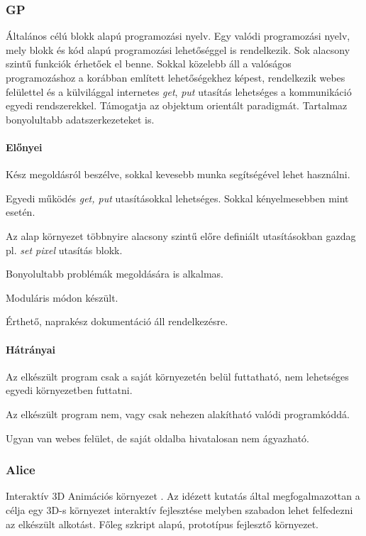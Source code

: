 \documentclass[12pt,a4paper,oneside]{report} %
\begin{document}
\subsubsection{GP} Általános célú blokk alapú \cite{ohshima2015module} \cite{monig2015blocks} programozási nyelv. Egy valódi programozási nyelv, mely blokk és kód alapú programozási lehetőséggel is rendelkezik.  Sok alacsony szintű funkciók érhetőek el benne. Sokkal közelebb áll a valóságos programozáshoz a korábban említett lehetőségekhez képest, rendelkezik webes felülettel és a külvilággal internetes \textit{get}, \textit{put} utasítás lehetséges a kommunikáció egyedi rendszerekkel. Támogatja az objektum orientált paradigmát. Tartalmaz bonyolultabb adatszerkezeteket is.
\paragraph{Előnyei} 
\begin{compactitem}
	\item Kész megoldásról beszélve, sokkal kevesebb munka segítségével lehet használni.
	\item Egyedi működés \textit{get, put} utasításokkal lehetséges. \newline Sokkal kényelmesebben mint  esetén.
	\item Az alap környezet többnyire alacsony szintű előre definiált utasításokban gazdag pl. \textit{set pixel} utasítás blokk.
	\item Bonyolultabb problémák megoldására is alkalmas.
	\item Moduláris módon készült.
	\item Érthető, naprakész dokumentáció áll rendelkezésre.
\end{compactitem}
\paragraph{Hátrányai} 
\begin{compactitem}
	\item Az elkészült program csak a saját környezetén belül futtatható, nem lehetséges egyedi környezetben futtatni.
	\item Az elkészült program nem, vagy csak nehezen alakítható valódi programkóddá.
	\item Ugyan van webes felület, de saját oldalba hivatalosan nem ágyazható.
\end{compactitem}

\subsubsection{Alice} Interaktív 3D Animációs környezet \cite{cooper2000alice}. Az idézett kutatás által megfogalmazottan a  célja egy 3D-s környezet interaktív fejlesztése melyben szabadon lehet felfedezni az elkészült alkotást. Főleg szkript alapú, prototípus fejlesztő környezet. 
\end{document}
